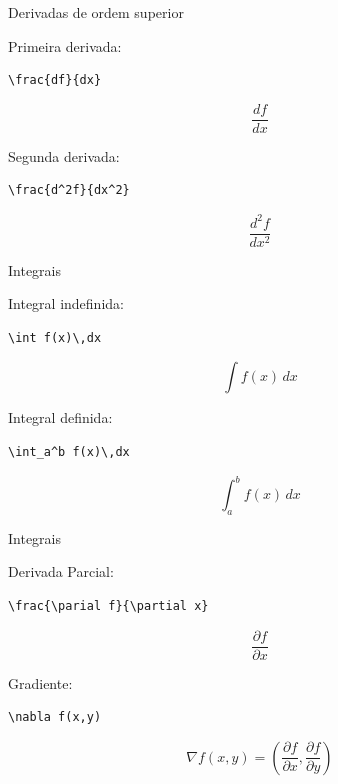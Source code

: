 \documentclass[aspectratio=169,xcolor=dvipsnames]{beamer}
\begin{document}
\begin{frame}[fragile]{Derivadas de ordem superior}

    Primeira derivada:

\begin{lstlisting}
\frac{df}{dx}
\end{lstlisting}

    \[
        \frac{df}{dx}
    \]

    Segunda derivada:

\begin{lstlisting}
\frac{d^2f}{dx^2}
\end{lstlisting}

    \[
        \frac{d^2f}{dx^2}
    \]

\end{frame}

\begin{frame}[fragile]{Integrais}

    Integral indefinida:

\begin{lstlisting}
\int f(x)\,dx
\end{lstlisting}

    \[
        \int f(x)\,dx
    \]

    Integral definida:

\begin{lstlisting}
\int_a^b f(x)\,dx
\end{lstlisting}

    \[
        \int_a^b f(x)\,dx
    \]

\end{frame}

\begin{frame}[fragile]{Integrais}

    Derivada Parcial:

\begin{lstlisting}
\frac{\parial f}{\partial x}
\end{lstlisting}

    \[
        \frac{\partial f}{\partial x}
    \]

    Gradiente:

\begin{lstlisting}
\nabla f(x,y)
\end{lstlisting}

    \[
    \nabla f(x,y) = \left( \frac{\partial f}{\partial x}, \frac{\partial f}{\partial y} \right)
    \]

\end{frame}
\end{document}

